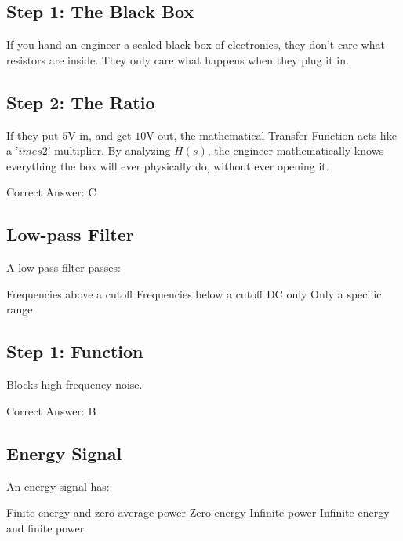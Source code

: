 \begin{solution}

\subsection*{Step 1: The Black Box}
If you hand an engineer a sealed black box of electronics, they don't care what resistors are inside. They only care what happens when they plug it in.

\subsection*{Step 2: The Ratio}
If they put $5\text{V}$ in, and get $10\text{V}$ out, the mathematical Transfer Function acts like a '$	imes 2$' multiplier. By analyzing $H(s)$, the engineer mathematically knows everything the box will ever physically do, without ever opening it.

Correct Answer: C
\end{solution}

\clearpage

\subsection{Low-pass Filter}

A low-pass filter passes:

\begin{choices}
    \choice Frequencies above a cutoff
    \correctchoice Frequencies below a cutoff
    \choice DC only
    \choice Only a specific range
\end{choices}

\begin{solution}

\subsection*{Step 1: Function}
Blocks high-frequency noise.

Correct Answer: B
\end{solution}

\clearpage

\subsection{Energy Signal}

An energy signal has:

\begin{choices}
    \correctchoice Finite energy and zero average power
    \choice Zero energy
    \choice Infinite power
    \choice Infinite energy and finite power
\end{choices}


